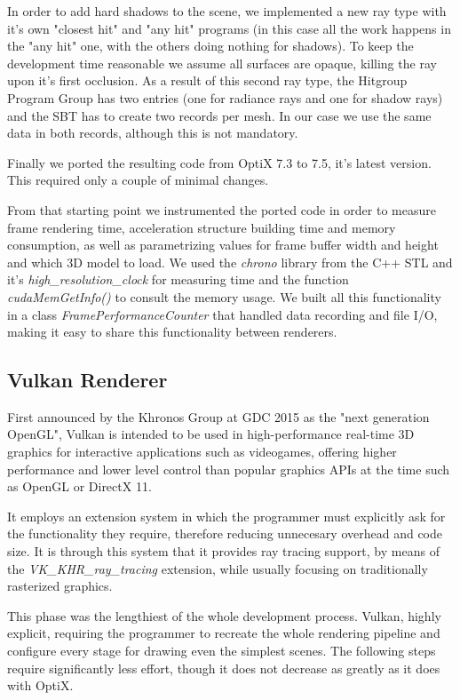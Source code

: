 In order to add hard shadows to the scene, we implemented a new ray type with it's own "closest hit" and "any hit" programs (in this case all the work happens in the "any hit" one, with the others doing nothing for shadows). To keep the development time reasonable we assume all surfaces are opaque, killing the ray upon it's first occlusion. As a result of this second ray type, the Hitgroup Program Group has two entries (one for radiance rays and one for shadow rays) and the SBT has to create two records per mesh. In our case we use the same data in both records, although this is not mandatory.

Finally we ported the resulting code from OptiX 7.3 to 7.5, it's latest version. This required only a couple of minimal changes.

From that starting point we instrumented the ported code in order to measure frame rendering time, acceleration structure building time and memory consumption, as well as parametrizing values for frame buffer width and height and which 3D model to load. We used the \textit{chrono} library from the C++ STL and it's \textit{high\_resolution\_clock} for measuring time and the function \textit{cudaMemGetInfo()} to consult the memory usage. We built all this functionality in a class \textit{FramePerformanceCounter} that handled data recording and file I/O, making it easy to share this functionality between renderers.

\subsection{Vulkan Renderer}
First announced by the Khronos Group at GDC 2015 as the "next generation OpenGL", Vulkan is intended to be used in high-performance real-time 3D graphics for interactive applications such as videogames, offering higher performance and lower level control than popular graphics APIs at the time such as OpenGL or DirectX 11.

It employs an extension system in which the programmer must explicitly ask for the functionality they require, therefore reducing unnecesary overhead and code size. It is through this system that it provides ray tracing support, by means of the \textit{VK\_KHR\_ray\_tracing} extension, while usually focusing on traditionally rasterized graphics.

This phase was the lengthiest of the whole development process. Vulkan, highly explicit, requiring the programmer to recreate the whole rendering pipeline and configure every stage for drawing even the simplest scenes. The following steps require significantly less effort, though it does not decrease as greatly as it does with OptiX.

